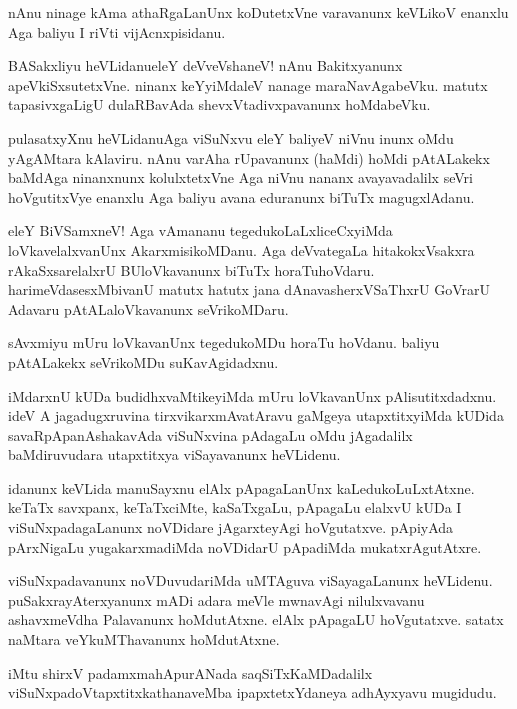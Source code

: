 \begin{mng}
nAnu ninage kAma athaRgaLanUnx koDutetxVne varavanunx keVLikoV enanxlu Aga baliyu I riVti vijAcnxpisidanu.
\end{mng}

\begin{mng}
BASakxliyu heVLidanu\mdash eleY deVveVshaneV! nAnu Bakitxyanunx apeVkiSxsutetxVne. ninanx keYyiMdaleV nanage maraNavAgabeVku. matutx tapasivxgaLigU dulaRBavAda shevxVtadivxpavanunx hoMdabeVku.
\end{mng}

\begin{mng}
pulasatxyXnu heVLidanu\mdash Aga viSuNxvu eleY baliyeV niVnu inunx oMdu yAgAMtara kAlaviru. nAnu varAha rUpavanunx (haMdi) hoMdi pAtALakekx baMdAga ninanxnunx kolulxtetxVne Aga niVnu nananx avayavadalilx seVri hoVgutitxVye enanxlu Aga baliyu avana eduranunx biTuTx magugxlAdanu.
\end{mng}

\begin{mng}
eleY BiVSamxneV! Aga vAmananu tegedukoLaLxliceCxyiMda loVkavelalxvanUnx AkarxmisikoMDanu. Aga deVvategaLa hitakokxVsakxra rAkaSxsarelalxrU BUloVkavanunx biTuTx horaTuhoVdaru. harimeVdasesxMbivanU matutx hatutx jana dAnavasherxVSaThxrU GoVrarU Adavaru pAtALaloVkavanunx seVrikoMDaru.
\end{mng}

\begin{mng}
sAvxmiyu mUru loVkavanUnx tegedukoMDu horaTu hoVdanu. baliyu pAtALakekx seVrikoMDu suKavAgidadxnu.
\end{mng}

\begin{mng}
iMdarxnU kUDa budidhxvaMtikeyiMda mUru loVkavanUnx pAlisutitxdadxnu. ideV A jagadugxruvina tirxvikarxmAvatAravu gaMgeya utapxtitxyiMda kUDida savaRpApanAshakavAda viSuNxvina pAdagaLu oMdu jAgadalilx baMdiruvudara utapxtitxya viSayavanunx heVLidenu.
\end{mng}

\begin{mng}
idanunx keVLida manuSayxnu elAlx pApagaLanUnx kaLedukoLuLxtAtxne. keTaTx savxpanx, keTaTxciMte, kaSaTxgaLu, pApagaLu elalxvU kUDa I viSuNxpadagaLanunx noVDidare jAgarxteyAgi hoVgutatxve. pApiyAda pArxNigaLu yugakarxmadiMda noVDidarU pApadiMda mukatxrAgutAtxre.
\end{mng}

\begin{mng}
viSuNxpadavanunx noVDuvudariMda uMTAguva viSayagaLanunx heVLidenu. puSakxrayAterxyanunx mADi adara meVle mwnavAgi nilulxvavanu ashavxmeVdha Palavanunx hoMdutAtxne. elAlx pApagaLU hoVgutatxve. satatx naMtara veYkuMThavanunx hoMdutAtxne.
\end{mng}
iMtu shirxV padamxmahApurANada saqSiTxKaMDadalilx viSuNxpadoVtapxtitxkathanaveMba ipapxtetxYdaneya adhAyxyavu mugidudu.

